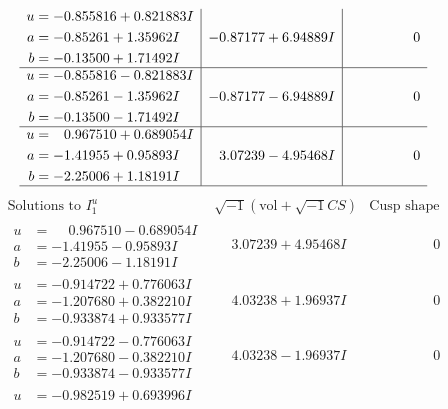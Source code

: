 \documentclass[1p]{elsarticle_modified}
\theoremstyle{definition}
\newcommand{\I}{\sqrt{-1}}
\begin{document}
$$\begin{array}{c|c|c}
\begin{aligned}
u &= -0.855816 + 0.821883 I \\
a &= -0.85261 + 1.35962 I \\
b &= -0.13500 + 1.71492 I\end{aligned}
 & -0.87177 + 6.94889 I & \phantom{-0.000000 } 0 \\ \hline\begin{aligned}
u &= -0.855816 - 0.821883 I \\
a &= -0.85261 - 1.35962 I \\
b &= -0.13500 - 1.71492 I\end{aligned}
 & -0.87177 - 6.94889 I & \phantom{-0.000000 } 0 \\ \hline\begin{aligned}
u &= \phantom{-}0.967510 + 0.689054 I \\
a &= -1.41955 + 0.95893 I \\
b &= -2.25006 + 1.18191 I\end{aligned}
 & \phantom{-}3.07239 - 4.95468 I & \phantom{-0.000000 } 0\\
 \hline 
 \end{array}$$\newpage$$\begin{array}{c|c|c}  
\text{Solutions to }I^u_{1}& \I (\text{vol} + \sqrt{-1}CS) & \text{Cusp shape}\\
 \hline 
\begin{aligned}
u &= \phantom{-}0.967510 - 0.689054 I \\
a &= -1.41955 - 0.95893 I \\
b &= -2.25006 - 1.18191 I\end{aligned}
 & \phantom{-}3.07239 + 4.95468 I & \phantom{-0.000000 } 0 \\ \hline\begin{aligned}
u &= -0.914722 + 0.776063 I \\
a &= -1.207680 + 0.382210 I \\
b &= -0.933874 + 0.933577 I\end{aligned}
 & \phantom{-}4.03238 + 1.96937 I & \phantom{-0.000000 } 0 \\ \hline\begin{aligned}
u &= -0.914722 - 0.776063 I \\
a &= -1.207680 - 0.382210 I \\
b &= -0.933874 - 0.933577 I\end{aligned}
 & \phantom{-}4.03238 - 1.96937 I & \phantom{-0.000000 } 0 \\ \hline\begin{aligned}
u &= -0.982519 + 0.693996 I \\

\end{aligned}
\end{array}$$
\end{document}
